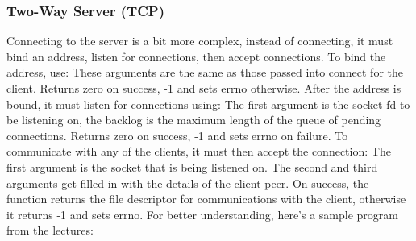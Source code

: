 \documentclass{article}
\begin{document}
\subsubsection{Two-Way Server (TCP)}
Connecting to the server is a bit more complex, instead of connecting, it must bind an address, listen for connections, then accept connections. To bind the address, use:
These arguments are the same as those passed into connect for the client. Returns zero on success, -1 and sets errno otherwise. After the address is bound, it must listen for connections using:
The first argument is the socket fd to be listening on, the backlog is the maximum length of the queue of pending connections. Returns zero on success, -1 and sets errno on failure. To communicate with any of the clients, it must then accept the connection:
The first argument is the socket that is being listened on. The second and third arguments get filled in with the details of the client peer. On success, the function returns the file descriptor for communications with the client, otherwise it returns -1 and sets errno. For better understanding, here's a sample program from the lectures:
\end{document}
